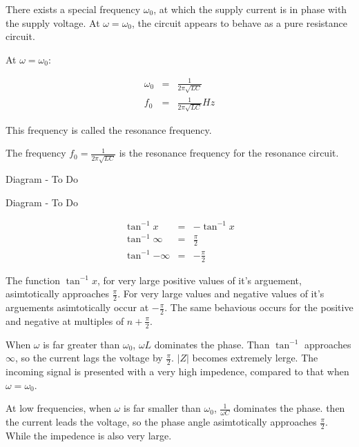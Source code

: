 \documentclass[a4paper,12pt]{article}
\begin{document}
There exists a special frequency $\omega_{0}$, at which the supply
current is in phase with the supply voltage. At $\omega = \omega_{0}$,
the circuit appears to behave as a pure resistance circuit.

At $\omega = \omega_{0}$:

\begin{eqnarray*}
\omega_{0} & = & \frac{1}{2 \pi\sqrt{LC}} \\
f_{0} & = & \frac{1}{2 \pi \sqrt{LC}} Hz
\end{eqnarray*}

This frequency is called the resonance frequency.

The frequency $f_{0} = \frac{1}{2 \pi \sqrt{LC}}$ is the resonance
frequency for the resonance circuit.

\begin{table}[hbtp]

Diagram - To Do

\end{table}

\begin{table}[hbtp]

Diagram - To Do

\end{table}

\begin{eqnarray*}
\tan^{-1}{x} & = & - \tan^{-1}{x} \\
\tan^{-1}{\infty} & = & \frac{\pi}{2} \\
\tan^{-1}{- \infty} & = & - \frac{\pi}{2}
\end{eqnarray*}

The function $\tan^{-1}{x}$, for very large positive values of it's
arguement, asimtotically approaches $\frac{\pi}{2}$. For very large
values and negative values of it's arguements asimtotically occur at $-
\frac{\pi}{2}$. The same behavious occurs for the positive and negative
at multiples of $n + \frac{\pi}{2}$.

When $\omega$ is far greater than $\omega_{0}$, $\omega L$ dominates the
phase. Than $\tan^{-1}$ approaches $\infty$, so the current lags the
voltage by $\frac{\pi}{2}$. $\left| Z \right|$ becomes extremely lerge.
The incoming signal is presented with a very high impedence, compared to
that when $\omega = \omega_{0}$.

At low frequencies, when $\omega$ is far smaller than $\omega_{0}$,
$\frac{1}{\omega C}$ dominates the phase. then the current leads the
voltage, so the phase angle asimtotically approaches $\frac{\pi}{2}$.
While the impedence is also very large.
\end{document}
